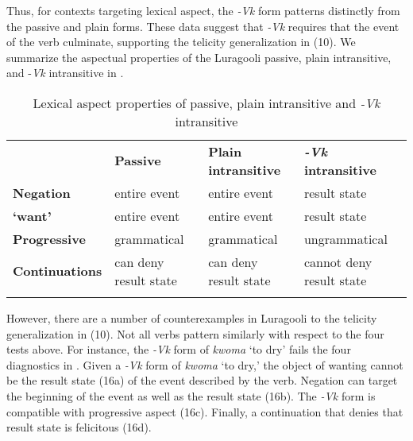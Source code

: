 \documentclass[output=paper]{langsci/langscibook}
\begin{document}
Thus, for contexts targeting lexical aspect, the \textit{-Vk} form patterns distinctly from the passive and plain forms. These data suggest that \textit{-Vk} requires that the event of the verb culminate, supporting the telicity generalization in (10). We summarize the aspectual properties of the Luragooli passive, plain intransitive, and -\textit{Vk} intransitive in . 

\begin{table}
\caption{Lexical aspect properties of passive, plain intransitive and \textit{-Vk} intransitive}
\label{tab:3}

\begin{tabularx}{\textwidth}{XXXX} & \textbf{Passive} & \textbf{Plain intransitive} & \textbf{\textit{-Vk}}\textbf{ intransitive}\\
\lsptoprule
\textbf{Negation} & entire event & entire event & result state\\
\textbf{‘want’} & entire event & entire event & result state\\
\textbf{Progressive} & grammatical & grammatical & ungrammatical\\
\textbf{Continuations} & can deny result state & can deny result state & cannot deny result state\\
\lspbottomrule
\end{tabularx}
\end{table}

However, there are a number of counterexamples in Luragooli to the telicity generalization in (10). Not all verbs pattern similarly with respect to the four tests above. For instance, the \textit{-Vk} form of \textit{kwoma} ‘to dry’ fails the four diagnostics in . Given a \textit{-Vk} form of \textit{kwoma }‘to dry,’ the object of wanting cannot be the result state (16a) of the event described by the verb. Negation can target the beginning of the event as well as the result state (16b). The \textit{-Vk} form is compatible with progressive aspect (16c). Finally, a continuation that denies that result state is felicitous (16d).
\end{document}
